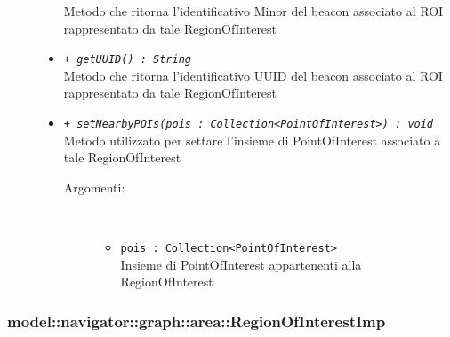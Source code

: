 \documentclass[../DefinizioneDiProdotto.tex]{subfiles}
\begin{document}
\begin{description}
\begin{itemize}
Metodo che ritorna l'identificativo Minor del beacon associato al ROI rappresentato da tale RegionOfInterest
 \item \texttt{+ \textit{getUUID() : String}}\\
Metodo che ritorna l'identificativo UUID del beacon associato al ROI rappresentato da tale RegionOfInterest
 \item \texttt{+ \textit{setNearbyPOIs(pois : Collection<PointOfInterest>) : void}}\\
Metodo utilizzato per settare l'insieme di PointOfInterest associato a tale RegionOfInterest
 \begin{description}
\item[Argomenti:] \
\begin{itemize}
\item \texttt{pois : Collection<PointOfInterest>}\\
Insieme di PointOfInterest appartenenti alla RegionOfInterest\end{itemize}
\end{description}
\end{itemize}
\end{description}

\subsubsection{model::navigator::graph::area::RegionOfInterestImp}
\end{document}
